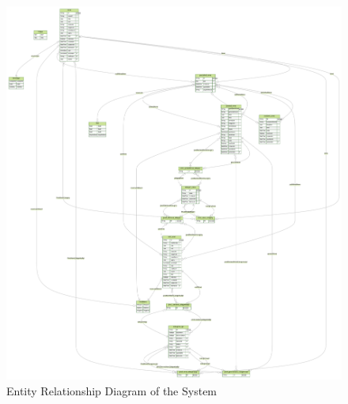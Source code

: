 \documentclass[12pt]{report}
\begin{document}
\clearpage %

\begin{figure}[p] %
\centering %
\includegraphics[width=\textwidth,height=\textheight,keepaspectratio]{ERD.png} %
\caption{Entity Relationship Diagram of the System} %
\label{fig:er_diagram} %
\end{figure}
\clearpage %
\end{document}
